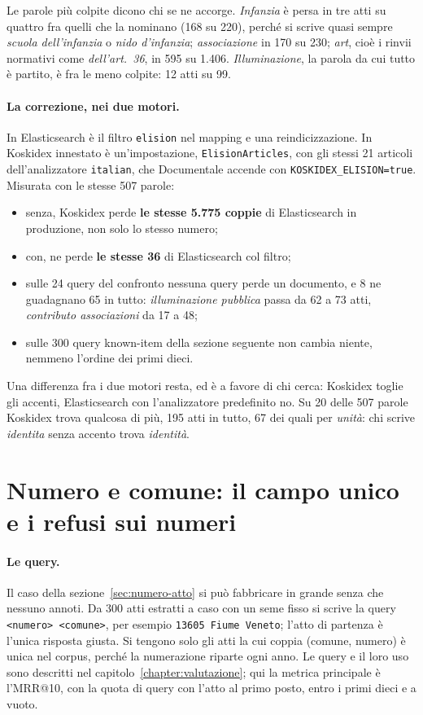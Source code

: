 Le parole più colpite dicono chi se ne accorge. \emph{Infanzia} è persa in tre atti
su quattro fra quelli che la nominano (168 su 220), perché si scrive quasi sempre
\emph{scuola dell'infanzia} o \emph{nido d'infanzia}; \emph{associazione} in 170 su
230; \emph{art}, cioè i rinvii normativi come \emph{dell'art.~36}, in 595 su 1.406.
\emph{Illuminazione}, la parola da cui tutto è partito, è fra le meno colpite: 12
atti su 99.

\paragraph{La correzione, nei due motori.} In Elasticsearch è il filtro
\texttt{elision} nel mapping e una reindicizzazione. In Koskidex innestato è
un'impostazione, \texttt{ElisionArticles}, con gli stessi 21 articoli
dell'analizzatore \texttt{italian}, che Documentale accende con
\texttt{KOSKIDEX\_ELISION=true}. Misurata con le stesse 507 parole:
\begin{itemize}
  \item senza, Koskidex perde \textbf{le stesse 5.775 coppie} di Elasticsearch in
        produzione, non solo lo stesso numero;
  \item con, ne perde \textbf{le stesse 36} di Elasticsearch col filtro;
  \item sulle 24 query del confronto nessuna query perde un documento, e 8 ne
        guadagnano 65 in tutto: \emph{illuminazione pubblica} passa da 62 a 73
        atti, \emph{contributo associazioni} da 17 a 48;
  \item sulle 300 query known-item della sezione seguente non cambia niente, nemmeno
        l'ordine dei primi dieci.
\end{itemize}
Una differenza fra i due motori resta, ed è a favore di chi cerca: Koskidex toglie
gli accenti, Elasticsearch con l'analizzatore predefinito no. Su 20 delle 507
parole Koskidex trova qualcosa di più, 195 atti in tutto, 67 dei quali per
\emph{unità}: chi scrive \emph{identita} senza accento trova \emph{identità}.

\section{Numero e comune: il campo unico e i refusi sui numeri}\label{sec:numero-comune}

\paragraph{Le query.} Il caso della sezione~\ref{sec:numero-atto} si può
fabbricare in grande senza che nessuno annoti. Da 300 atti estratti a caso con un
seme fisso si scrive la query \texttt{<numero> <comune>}, per esempio
\texttt{13605 Fiume Veneto}; l'atto di partenza è l'unica risposta giusta. Si
tengono solo gli atti la cui coppia (comune, numero) è unica nel corpus, perché
la numerazione riparte ogni anno. Le query e il loro uso sono descritti nel
capitolo~\ref{chapter:valutazione}; qui la metrica principale è l'MRR@10, con la
quota di query con l'atto al primo posto, entro i primi dieci e a vuoto.

